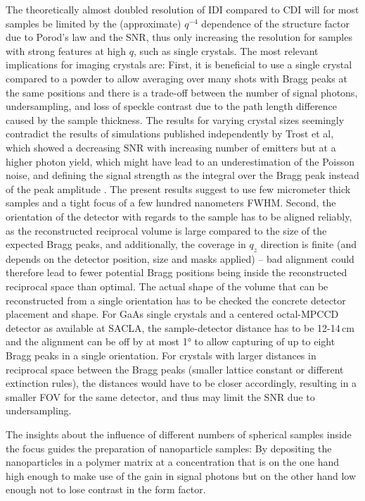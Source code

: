 The theoretically almost doubled resolution of IDI compared to CDI will for most samples be limited by the (approximate) $q^{-4}$ dependence of the structure factor due to Porod's law and the SNR, thus only increasing the resolution for samples with strong features at high $q$, such as single crystals.
The most relevant implications for imaging crystals are: First, it is beneficial to use a single crystal compared to a powder to allow averaging over many shots with Bragg peaks at the same positions and there is a trade-off between the number of signal photons, undersampling, and loss of speckle contrast due to the path length difference caused by the sample thickness. The results for varying crystal sizes seemingly contradict the results of simulations published independently by Trost et al, which showed a decreasing SNR with increasing number of emitters but at a higher photon yield, which might have lead to an underestimation of the Poisson noise, and defining the signal strength as the integral over the Bragg peak instead of the peak amplitude \cite{trost2020}. The present results suggest to use few micrometer thick samples and a tight focus of a few hundred nanometers FWHM. Second, the orientation of the detector with regards to the sample has to be aligned reliably, as the reconstructed reciprocal volume is large compared to the size of the expected Bragg peaks, and additionally, the coverage in $q_z$ direction is finite (and depends on the detector position, size and masks applied) -- bad alignment could therefore lead to fewer potential Bragg positions being inside the reconstructed reciprocal space than optimal. The actual shape of the volume that can be reconstructed from a single orientation has to be checked the concrete detector placement and shape.  For GaAs single crystals and a centered octal-MPCCD detector as available at SACLA, the sample-detector distance has to be 12-14\,cm and the alignment can be off by at most 1° to allow capturing of up to eight Bragg peaks in a single orientation. For crystals with larger distances in reciprocal space between the Bragg peaks (smaller lattice constant or different extinction rules), the distances would have to be closer accordingly, resulting in a smaller FOV for the same detector, and thus may limit the SNR due to undersampling.

The insights about the influence of different numbers of spherical samples inside the focus guides the preparation of nanoparticle samples: By depositing the nanoparticles in a polymer matrix at a concentration that is on the one hand high enough to make use of the gain in signal photons but on the other hand low enough not to lose contrast in the form factor.



